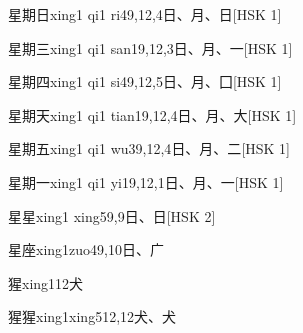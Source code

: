 \begin{EntryWithPhonetic}{星期日}{xing1 qi1 ri4}{9,12,4}{⽇、⽉、⽇}[HSK 1]
\end{EntryWithPhonetic}

\begin{EntryWithPhonetic}{星期三}{xing1 qi1 san1}{9,12,3}{⽇、⽉、⼀}[HSK 1]
\end{EntryWithPhonetic}

\begin{EntryWithPhonetic}{星期四}{xing1 qi1 si4}{9,12,5}{⽇、⽉、⼞}[HSK 1]
\end{EntryWithPhonetic}

\begin{EntryWithPhonetic}{星期天}{xing1 qi1 tian1}{9,12,4}{⽇、⽉、⼤}[HSK 1]
\end{EntryWithPhonetic}

\begin{EntryWithPhonetic}{星期五}{xing1 qi1 wu3}{9,12,4}{⽇、⽉、⼆}[HSK 1]
\end{EntryWithPhonetic}

\begin{EntryWithPhonetic}{星期一}{xing1 qi1 yi1}{9,12,1}{⽇、⽉、⼀}[HSK 1]
\end{EntryWithPhonetic}

\begin{EntryWithPhonetic}{星星}{xing1 xing5}{9,9}{⽇、⽇}[HSK 2]
\end{EntryWithPhonetic}

\begin{EntryWithPhonetic}{星座}{xing1zuo4}{9,10}{⽇、⼴}
\end{EntryWithPhonetic}

\begin{EntryWithPhonetic}{猩}{xing1}{12}{⽝}
\end{EntryWithPhonetic}

\begin{EntryWithPhonetic}{猩猩}{xing1xing5}{12,12}{⽝、⽝}
\end{EntryWithPhonetic}

